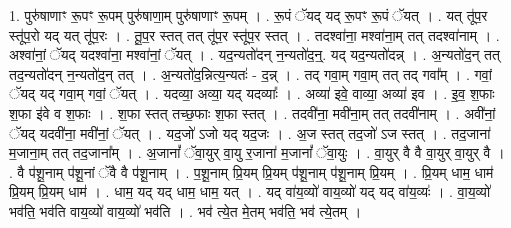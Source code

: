 \documentclass[17pt]{extarticle}
\begin{document}
1. पुरु॑षाणाꣳ रू॒पꣳ रू॒पम् पुरु॑षाणा॒म् पुरु॑षाणाꣳ रू॒पम् । . रू॒पं ॅयद् यद् रू॒पꣳ रू॒पं ॅयत् । . यत् तू॑प॒र स्तू॑प॒रो यद् यत् तू॑प॒रः । . तू॒प॒र स्तत् तत् तू॑प॒र स्तू॑प॒र स्तत् । . तदश्वा॑ना॒ मश्वा॑ना॒म् तत् तदश्वा॑नाम् । . अश्वा॑नां॒ ॅयद् यदश्वा॑ना॒ मश्वा॑नां॒ ॅयत् । . यद॒न्यतो॑दन् न॒न्यतो॑द॒न्॒. यद् यद॒न्यतो॑दन्न् । . अ॒न्यतो॑द॒न् तत् तद॒न्यतो॑दन् न॒न्यतो॑द॒न् तत् । . अ॒न्यतो॑द॒न्नित्य॒न्यतः॑ - द॒न्न् । . तद् गवा॒म् गवा॒म् तत् तद् गवा᳚म् । . गवां॒ ॅयद् यद् गवा॒म् गवां॒ ॅयत् । . यदव्या॒ अव्या॒ यद् यदव्याः᳚ । . अव्या॑ इवे॒ वाव्या॒ अव्या॑ इव । . इ॒व॒ श॒फाः श॒फा इ॑वे व श॒फाः । . श॒फा स्तत् तच्छ॒फाः श॒फा स्तत् । . तदवी॑ना॒ मवी॑ना॒म् तत् तदवी॑नाम् । . अवी॑नां॒ ॅयद् यदवी॑ना॒ मवी॑नां॒ ॅयत् । . यद॒जो॑ ऽजो यद् यद॒जः । . अ॒ज स्तत् तद॒जो॑ ऽज स्तत् । . तद॒जाना॑ म॒जाना॒म् तत् तद॒जाना᳚म् । . अ॒जानां᳚ ॅवा॒युर् वा॒यु र॒जाना॑ म॒जानां᳚ ॅवा॒युः । . वा॒युर् वै वै वा॒युर् वा॒युर् वै । . वै प॑शू॒नाम् प॑शू॒नां ॅवै वै प॑शू॒नाम् । . प॒शू॒नाम् प्रि॒यम् प्रि॒यम् प॑शू॒नाम् प॑शू॒नाम् प्रि॒यम् । . प्रि॒यम् धाम॒ धाम॑ प्रि॒यम् प्रि॒यम् धाम॑ । . धाम॒ यद् यद् धाम॒ धाम॒ यत् । . यद् वा॑य॒व्यो॑ वाय॒व्यो॑ यद् यद् वा॑य॒व्यः॑ । . वा॒य॒व्यो॑ भव॑ति॒ भव॑ति वाय॒व्यो॑ वाय॒व्यो॑ भव॑ति । . भव॑ त्ये॒त मे॒तम् भव॑ति॒ भव॑ त्ये॒तम् । \newline
\end{document}
